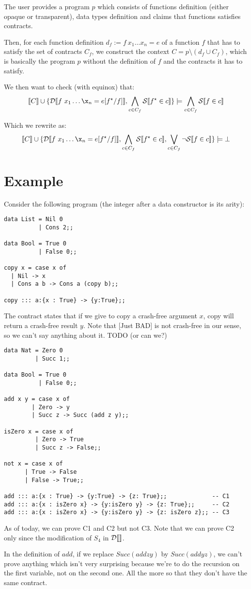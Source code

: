 \documentclass{article}
\begin{document}
The user provides a program $p$ which consists of functions definition (either opaque or transparent), data types definition and claims that functions satisfies contracts.

Then, for each function definition $d_f := f~x_1 \dots x_n = e$ of a function $f$ that has to satisfy the set of contracts $C_f$, we construct the context $C = p \setminus ( d_f \cup C_f )$, which is basically the program $p$ without the definition of $f$ and the contracts it has to satisfy. 

We then want to check (with equinox) that:
 $$\trans{C} \cup \{ \dtrans{f~x_1 \dots \x_n = e[f^\star/f]}, \bigwedge_{c \in C_f} \strans{f^\star \in c} \} \models \bigwedge_{c \in C_f} \strans{f \in c}$$

Which we rewrite as:
 $$\trans{C} \cup \{ \dtrans{f~x_1 \dots \x_n = e[f^\star/f]}, \bigwedge_{c \in C_f} \strans{f^\star \in c},  \bigvee_{c \in C_f} \lnot \strans{f \in c} \} \models \bot$$

\section{Example}
Consider the following program (the integer after a data constructor is its arity):
\begin{verbatim}
data List = Nil 0
          | Cons 2;;

data Bool = True 0
          | False 0;;

copy x = case x of
  | Nil -> x
  | Cons a b -> Cons a (copy b);;

copy ::: a:{x : True} -> {y:True};;
\end{verbatim}
The contract states that if we give to copy a crash-free argument $x$, copy will return a crash-free result $y$.
Note that [Just BAD] is not crash-free in our sense, so we can't say anything about it. TODO (or can we?)


\begin{verbatim}
data Nat = Zero 0
         | Succ 1;;

data Bool = True 0
          | False 0;;

add x y = case x of
        | Zero -> y
        | Succ z -> Succ (add z y);;

isZero x = case x of
         | Zero -> True
         | Succ z -> False;;

not x = case x of
      | True -> False
      | False -> True;;

add ::: a:{x : True} -> {y:True} -> {z: True};;             -- C1
add ::: a:{x : isZero x} -> {y:isZero y} -> {z: True};;     -- C2
add ::: a:{x : isZero x} -> {y:isZero y} -> {z: isZero z};; -- C3
\end{verbatim}

As of today, we can prove C1 and C2 but not C3.
Note that we can prove C2 only since the modification of $S_4$ in $\mathcal{D} \llbracket  \rrbracket$.

In the definition of $add$, if we replace $Succ (add z y)$ by $Succ (add y z)$, we can't prove anything which isn't very surprising because we're to do the recursion on the first variable, not on the second one. All the more so that they don't have the same contract.
\end{document}
